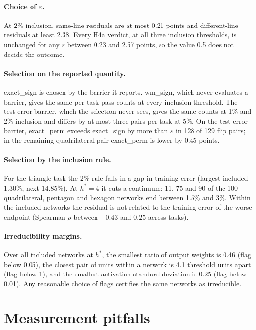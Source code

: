 \documentclass[11pt]{article}
\newcommand{\md}[1]{\textsf{#1}}
\newcommand{\eps}{\varepsilon}
\begin{document}
\paragraph{Choice of $\eps$.} At 2\% inclusion, same-line residuals are at most 0.21 points and different-line residuals at least 2.38. Every H4a verdict, at all three inclusion thresholds, is unchanged for any $\eps$ between 0.23 and 2.57 points, so the value 0.5 does not decide the outcome.

\paragraph{Selection on the reported quantity.} \md{exact\_sign} is chosen by the barrier it reports. \md{wm\_sign}, which never evaluates a barrier, gives the same per-task pass counts at every inclusion threshold. The test-error barrier, which the selection never sees, gives the same counts at 1\% and 2\% inclusion and differs by at most three pairs per task at 5\%. On the test-error barrier, \md{exact\_perm} exceeds \md{exact\_sign} by more than $\eps$ in 128 of 129 flip pairs; in the remaining quadrilateral pair \md{exact\_perm} is lower by 0.45 points.

\paragraph{Selection by the inclusion rule.} For the triangle task the 2\% rule falls in a gap in training error (largest included 1.30\%, next 14.85\%). At $h^* = 4$ it cuts a continuum: 11, 75 and 90 of the 100 quadrilateral, pentagon and hexagon networks end between 1.5\% and 3\%. Within the included networks the residual is not related to the training error of the worse endpoint (Spearman $\rho$ between $-0.43$ and $0.25$ across tasks).

\paragraph{Irreducibility margins.} Over all included networks at $h^*$, the smallest ratio of output weights is 0.46 (flag below 0.05), the closest pair of units within a network is 4.1 threshold units apart (flag below 1), and the smallest activation standard deviation is 0.25 (flag below 0.01). Any reasonable choice of flags certifies the same networks as irreducible.

\section{Measurement pitfalls}
\label{sec:pitfalls}
\end{document}
